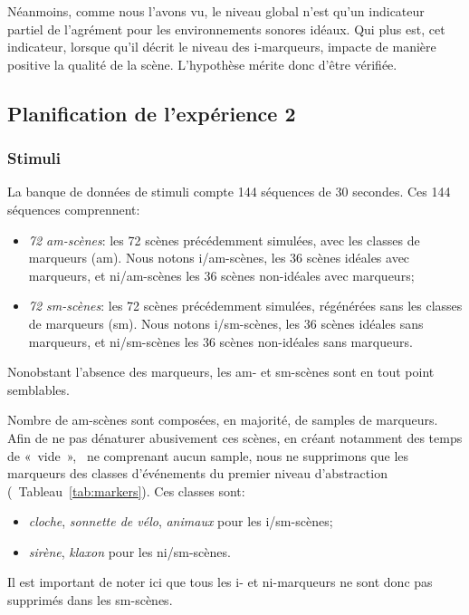 \documentclass[twoside,twocolumn]{article}
\begin{document}
Néanmoins, comme nous l'avons vu, le niveau global n'est qu'un indicateur partiel de l'agrément pour les environnements sonores idéaux. Qui plus est, cet indicateur, lorsque qu'il décrit le niveau des i-marqueurs, impacte de manière positive la qualité de la scène. L'hypothèse mérite donc d'être vérifiée.

\subsection{Planification de l'expérience 2}

\subsubsection*{Stimuli}

La banque de données de stimuli compte 144 séquences de 30 secondes. Ces 144 séquences comprennent:

\begin{itemize}
\item \emph{72 am-scènes}: les 72 scènes précédemment simulées, avec les classes de marqueurs (am). Nous notons i/am-scènes, les 36 scènes idéales avec marqueurs, et ni/am-scènes les 36 scènes non-idéales avec marqueurs;
\item \emph{72 sm-scènes}: les 72 scènes précédemment simulées, régénérées sans les classes de marqueurs (sm). Nous notons i/sm-scènes, les 36 scènes idéales sans marqueurs, et ni/sm-scènes les 36 scènes non-idéales sans marqueurs.
\end{itemize}

Nonobstant l'absence des marqueurs, les am- et sm-scènes sont en tout point semblables.

Nombre de am-scènes sont composées, en majorité, de samples de marqueurs. Afin de ne pas dénaturer abusivement ces scènes, en créant notamment des temps de «~vide~», \ie~ne comprenant aucun sample, nous ne supprimons que les marqueurs des classes d'événements du premier niveau d'abstraction (\cf~Tableau~\ref{tab:markers}). Ces classes sont:

\begin{itemize}
\item \emph{cloche}, \emph{sonnette de vélo}, \emph{animaux} pour les i/sm-scènes;
\item \emph{sirène}, \emph{klaxon} pour les ni/sm-scènes.
\end{itemize}

Il est important de noter ici que tous les i- et ni-marqueurs ne sont donc pas supprimés dans les sm-scènes.
\end{document}
